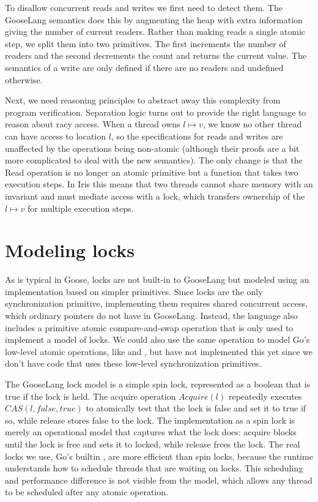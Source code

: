To disallow concurrent reads and writes we first need to detect them.
The GooseLang semantics does this by augmenting the heap with extra
information giving the number of current readers. Rather than making
reads a single atomic step, we split them into two primitives. The first
increments the number of readers and the second decrements the count and
returns the current value. The semantics of a write are only defined if
there are no readers and undefined otherwise.

Next, we need reasoning principles to abstract away this complexity from
program verification. Separation logic turns out to provide the right
language to reason about racy access. When a thread owns
\(l \mapsto v\), we know no other thread can have access to location
\(l\), so the specifications for reads and writes are unaffected by the
operations being non-atomic (although their proofs are a bit more
complicated to deal with the new semantics). The only change is that the
Read operation is no longer an atomic primitive but a function that
takes two execution steps. In Iris this means that two threads cannot
share memory with an invariant and must mediate access with a lock,
which transfers ownership of the \(l \mapsto v\) for multiple execution
steps.

\section{Modeling locks}

As is typical in Goose, locks are not built-in to GooseLang but modeled
using an implementation based on simpler primitives. Since locks are the
only synchronization primitive, implementing them requires shared
concurrent access, which ordinary pointers do not have in GooseLang.
Instead, the language also includes a primitive atomic compare-and-swap
operation that is only used to implement a model of locks. We could also
use the same operation to model Go's low-level atomic operations, like
 and , but
have not implemented this yet since we don't have code that uses these
low-level synchronization primitives.

The GooseLang lock model is a simple spin lock, represented as a boolean
that is true if the lock is held. The acquire operation \(Acquire(l)\)
repeatedly executes \(CAS(l, false, true)\) to atomically test that the
lock is false and set it to true if so, while release stores false to
the lock. The implementation as a spin lock is merely an operational
model that captures what the lock does: acquire blocks until the lock is
free and sets it to locked, while release frees the lock. The real locks
we use, Go's builtin , are more efficient than spin
locks, because the runtime understands how to schedule threads that are
waiting on locks. This scheduling and performance difference is not
visible from the model, which allows any thread to be scheduled after
any atomic operation.

